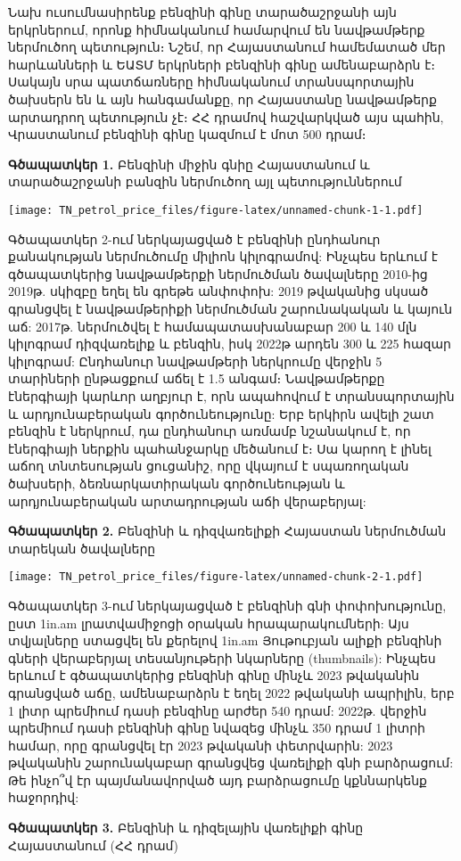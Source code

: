 \documentclass[
]{article}
\begin{document}
Նախ ուսումնասիրենք բենզինի գինը տարածաշրջանի այն երկրներում, որոնք
հիմնականում համարվում են նավթամթերք ներմուծող պետություն։ Նշեմ, որ
Հայաստանում համեմատած մեր հարևանների և ԵԱՏՄ երկրների բենզինի գինը
ամենաբարձրն է։ Սակայն սրա պատճառները հիմնականում տրանսպորտային ծախսերն
են և այն հանգամանքը, որ Հայաստանը նավթամթերք արտադրող պետություն չէ։ ՀՀ
դրամով հաշվարկված այս պահին, Վրաստանում բենզինի գինը կազմում է մոտ 500
դրամ։

\textbf{Գծապատկեր 1.} Բենզինի միջին գնիը Հայաստանում և տարածաշրջանի
բանզին ներմուծող այլ պետություններում

\texttt{[image: TN\_petrol\_price\_files/figure-latex/unnamed-chunk-1-1.pdf]}

Գծապատկեր 2-ում ներկայացված է բենզինի ընդհանուր քանակության ներմուծումը
միլիոն կիլոգրամով: Ինչպես երևում է գծապատկերից նավթամթերքի ներմուծման
ծավալները 2010-ից 2019թ. սկիզբը եղել են գրեթե անփոփոխ: 2019 թվականից
սկսած գրանցվել է նավթամթերիքի ներմուծման շարունակական և կայուն աճ:
2017թ. ներմուծվել է համապատասխանաբար 200 և 140 մլն կիլոգրամ դիզվառելիք և
բենզին, իսկ 2022թ արդեն 300 և 225 հազար կիլոգրամ: Ընդհանուր նավթամթերի
ներկրումը վերջին 5 տարիների ընթացքում աճել է 1.5 անգամ։ Նավթամթերքը
էներգիայի կարևոր աղբյուր է, որն ապահովում է տրանսպորտային և
արդյունաբերական գործունեությունը: Երբ երկիրն ավելի շատ բենզին է
ներկրում, դա ընդհանուր առմամբ նշանակում է, որ էներգիայի ներքին
պահանջարկը մեծանում է։ Սա կարող է լինել աճող տնտեսության ցուցանիշ, որը
վկայում է սպառողական ծախսերի, ձեռնարկատիրական գործունեության և
արդյունաբերական արտադրության աճի վերաբերյալ:

\textbf{Գծապատկեր 2.} Բենզինի և դիզվառելիքի Հայաստան ներմուծման տարեկան
ծավալները

\texttt{[image: TN\_petrol\_price\_files/figure-latex/unnamed-chunk-2-1.pdf]}

Գծապատկեր 3-ում ներկայացված է բենզինի գնի փոփոխությունը, ըստ 1in.am
լրատվամիջոցի օրական հրապարակումների: Այս տվյալները ստացվել են քերելով
1in.am Յութուբյան ալիքի բենզինի գների վերաբերյալ տեսանյութերի նկարները
(thumbnails): Ինչպես երևում է գծապատկերից բենզինի գինը մինչև 2023
թվականին գրանցված աճը, ամենաբարձրն է եղել 2022 թվականի ապրիլին, երբ 1
լիտր պրեմիում դասի բենզինը արժեր 540 դրամ: 2022թ. վերջին պրեմիում դասի
բենզինի գինը նվազեց մինչև 350 դրամ 1 լիտրի համար, որը գրանցվել էր 2023
թվականի փետրվարին: 2023 թվականին շարունակաբար գրանցվեց վառելիքի գնի
բարձրացում: Թե ինչո՞վ էր պայմանավորված այդ բարձրացումը կքննարկենք
հաջորդիվ:

\textbf{Գծապատկեր 3.} Բենզինի և դիզելային վառելիքի գինը Հայաստանում (ՀՀ
դրամ)
\end{document}
